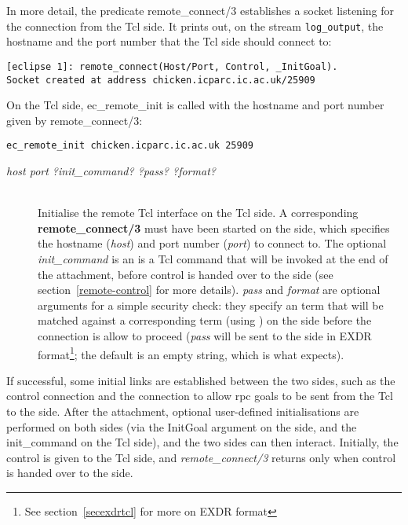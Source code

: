 In more detail, the {\eclipse} predicate remote_connect/3  establishes a
socket listening for the connection from the Tcl side. It prints out, on
the stream {\tt log_output}, the
hostname and the port number that the Tcl side should connect to:

\begin{verbatim}
[eclipse 1]: remote_connect(Host/Port, Control, _InitGoal).
Socket created at address chicken.icparc.ic.ac.uk/25909
\end{verbatim}

On the Tcl side, ec_remote_init is called with the hostname and port number
given by remote_connect/3:

\begin{verbatim}
ec_remote_init chicken.icparc.ic.ac.uk 25909
\end{verbatim}

\begin{description}
\item[ {\it host port ?init_command? ?pass? ?format?}]\ \\
	Initialise the remote Tcl interface on the Tcl side. A
	corresponding {\bf remote_connect/3} must have been started on the
	{\eclipse} side, which specifies the hostname ({\it host}) and port
	number ({\it port}) to connect to. The optional {\it
	init_command\/} is an is a Tcl command that will be invoked at the
	end of the attachment, before control is handed over to the
	{\eclipse} side (see section~\ref{remote-control} for more
	details). {\it pass\/} and {\it format\/} are optional arguments for a simple
	security check: they specify an {\eclipse} term that will be
	matched against a corresponding term (using ) on the
	{\eclipse} side before the connection is allow to proceed ({\it pass\/}
	will be sent to the {\eclipse} side in EXDR format\footnote{See
	section~\ref{secexdrtcl} for more on EXDR format}; the default is
	an empty string, which is what 
	expects).

\end{description}

If successful, some initial links are established between the two sides,
such as the control connection and the connection to allow rpc goals to be
sent from the Tcl to the {\eclipse} side. 
After the attachment, optional user-defined
initialisations are performed on both sides (via the InitGoal argument on
the {\eclipse} side, and the init_command on the Tcl side), and the two
sides can then interact. Initially, the control is given to the Tcl side,
and {\it remote_connect/3} returns only when control is handed over to the
{\eclipse} side. 

